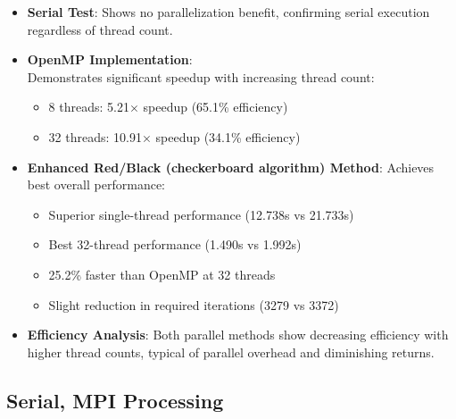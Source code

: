 \documentclass[11pt]{article}
\begin{document}
  \begin{itemize}
    \item \textbf{Serial Test}: Shows no parallelization benefit, confirming serial execution regardless of thread count.
    
    \item \textbf{OpenMP Implementation}: 
    \\Demonstrates significant speedup with increasing thread count:
      \begin{itemize}
      \item 8 threads: 5.21$\times$ speedup (65.1\% efficiency)
      \item 32 threads: 10.91$\times$ speedup (34.1\% efficiency)
      \end{itemize}
    
    \item \textbf{Enhanced Red/Black (checkerboard algorithm) Method}: Achieves best overall performance:
      \begin{itemize}
      \item Superior single-thread performance (12.738s vs 21.733s)
      \item Best 32-thread performance (1.490s vs 1.992s)
      \item 25.2\% faster than OpenMP at 32 threads
      \item Slight reduction in required iterations (3279 vs 3372)
      \end{itemize}
    
    \item \textbf{Efficiency Analysis}: Both parallel methods show decreasing efficiency with higher thread counts, typical of parallel overhead and diminishing returns.
  
  \end{itemize}

\subsection {Serial, MPI Processing}
\end{document}
